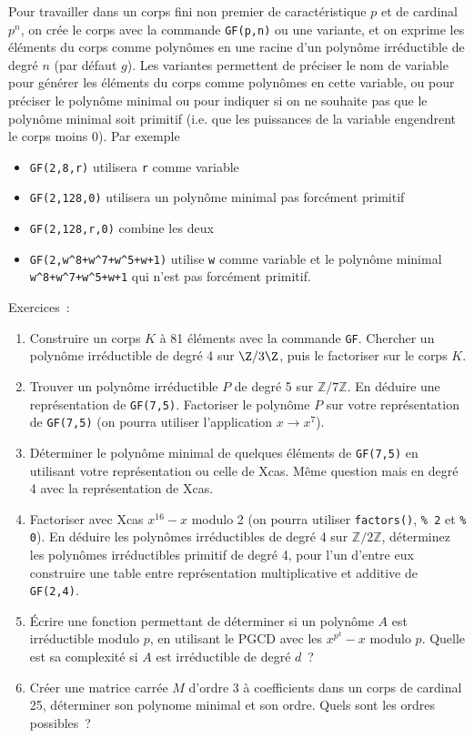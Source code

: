 \documentclass[a4paper,11pt]{book}
\begin{document}
\begin{giacjshere}
Pour travailler dans un corps fini non premier de caract\'eristique $p$
et de cardinal $p^n$,
on cr\'ee le corps avec la commande \verb|GF(p,n)| ou une variante,
et on exprime les \'el\'ements du corps comme polyn\^omes en une racine
d'un polyn\^ome irr\'eductible de degr\'e $n$ (par d\'efaut $g$).
Les variantes permettent de pr\'eciser le nom de variable pour 
g\'en\'erer les \'el\'ements du corps comme polyn\^omes en cette variable, 
ou pour pr\'eciser le polyn\^ome minimal ou pour indiquer si on ne souhaite
pas que le polyn\^ome minimal soit primitif (i.e. que les puissances
de la variable engendrent le corps moins 0). Par exemple
\begin{itemize}
\item \verb|GF(2,8,r)| utilisera \verb|r| comme variable
\item \verb|GF(2,128,0)| utilisera un polyn\^ome minimal pas forc\'ement 
primitif
\item \verb|GF(2,128,r,0)| combine les deux
\item \verb|GF(2,w^8+w^7+w^5+w+1)| utilise \verb|w| comme variable
et le polyn\^ome minimal \verb|w^8+w^7+w^5+w+1| qui n'est pas forc\'ement
primitif.
\end{itemize}

Exercices~:
\begin{enumerate}
\item Construire un corps $K$ \`a 81 \'el\'ements avec la commande \verb|GF|.
Chercher un polyn\^ome irr\'eductible de degr\'e 4 sur $\Z/3\Z$,
puis le factoriser sur le corps $K$.
\item Trouver un polyn\^ome irr\'eductible $P$ de degr\'e 5 sur $\mathbb{Z}/7\mathbb{Z}$.
En d\'eduire une repr\'esentation de \verb|GF(7,5)|. Factoriser 
le polyn\^ome $P$ sur votre repr\'esentation de \verb|GF(7,5)| (on pourra utiliser
l'application $x \rightarrow x^7$).
\item D\'eterminer le polyn\^ome minimal de quelques \'el\'ements
de \verb|GF(7,5)| en utilisant votre repr\'esentation ou celle de Xcas.
M\^eme question mais en degr\'e 4 avec la repr\'esentation de Xcas.
\item Factoriser avec Xcas $x^{16}-x$ modulo 2 (on pourra utiliser
\verb|factors()|, \verb|% 2| et \verb|% 0|). 
En d\'eduire les polyn\^omes irr\'eductibles de degr\'e 4 sur
  $\mathbb{Z}/2\mathbb{Z}$, d\'eterminez les polyn\^omes irr\'eductibles
primitif de degr\'e 4, pour l'un d'entre eux construire une table 
entre repr\'esentation
multiplicative et additive de \verb|GF(2,4)|.
\item \'Ecrire une fonction permettant de d\'eterminer si un
  polyn\^ome $A$ est irr\'eductible modulo $p$, en utilisant le
PGCD avec les $x^{p^k}-x$ modulo $p$. 
Quelle est sa complexit\'e si $A$ est irr\'eductible de degr\'e $d$~?
\item Cr\'eer une matrice carr\'ee $M$ d'ordre 3 \`a coefficients
dans un corps de cardinal 25, d\'eterminer son polynome
minimal et son ordre. Quels sont les ordres possibles~?
\end{enumerate}


\end{giacjshere}
\end{document}
